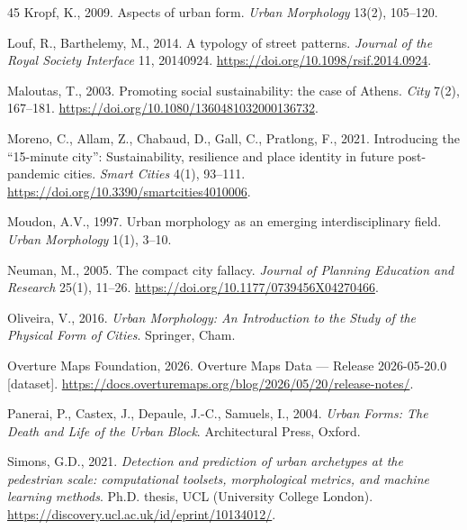 \documentclass[review,authoryear]{elsarticle}
\begin{document}
\begin{thebibliography}{45}
  Kropf, K., 2009.
  \newblock Aspects of urban form.
  \newblock \emph{Urban Morphology} 13(2), 105--120.

  Louf, R., Barthelemy, M., 2014.
  \newblock A typology of street patterns.
  \newblock \emph{Journal of the Royal Society Interface} 11, 20140924.
  \newblock \url{https://doi.org/10.1098/rsif.2014.0924}.

  Maloutas, T., 2003.
  \newblock Promoting social sustainability: the case of Athens.
  \newblock \emph{City} 7(2), 167--181.
  \newblock \url{https://doi.org/10.1080/1360481032000136732}.

  Moreno, C., Allam, Z., Chabaud, D., Gall, C., Pratlong, F., 2021.
  \newblock Introducing the ``15-minute city'': Sustainability, resilience and place identity in future post-pandemic cities.
  \newblock \emph{Smart Cities} 4(1), 93--111.
  \newblock \url{https://doi.org/10.3390/smartcities4010006}.

  Moudon, A.V., 1997.
  \newblock Urban morphology as an emerging interdisciplinary field.
  \newblock \emph{Urban Morphology} 1(1), 3--10.

  Neuman, M., 2005.
  \newblock The compact city fallacy.
  \newblock \emph{Journal of Planning Education and Research} 25(1), 11--26.
  \newblock \url{https://doi.org/10.1177/0739456X04270466}.

  Oliveira, V., 2016.
  \newblock \emph{Urban Morphology: An Introduction to the Study of the Physical Form of Cities}.
  \newblock Springer, Cham.

  {Overture Maps Foundation}, 2026.
  \newblock Overture Maps Data --- Release 2026-05-20.0 [dataset].
  \newblock \url{https://docs.overturemaps.org/blog/2026/05/20/release-notes/}.

  Panerai, P., Castex, J., Depaule, J.-C., Samuels, I., 2004.
  \newblock \emph{Urban Forms: The Death and Life of the Urban Block}.
  \newblock Architectural Press, Oxford.

  Simons, G.D., 2021.
  \newblock \emph{Detection and prediction of urban archetypes at the pedestrian scale: computational toolsets, morphological metrics, and machine learning methods}.
  \newblock Ph.D. thesis, UCL (University College London).
  \newblock \url{https://discovery.ucl.ac.uk/id/eprint/10134012/}.


\end{thebibliography}
\end{document}
